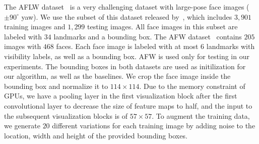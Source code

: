 \begin{table}[t!]\small
\caption{\small Number and size of convolutional filters in each visualization block. For all blocks, the two fully connected layers have the same length of $800$ and $236$.}\figvspace\vspace{-3mm}
\begin{center}
\end{center}
\label{table:VBdetail}\vspace{-10mm}
\end{table}
\vspace{-1mm}
\vspace{-2mm}
The AFLW dataset~\cite{kostinger2011annotated} is a very challenging dataset with large-pose face images ($\pm90^{\circ}$ yaw). 
We use the subset of this dataset released by~\cite{jourabloo2016large}, which includes $3,901$ training images  and $1,299$ testing images. 
All face images in this subset are labeled with $34$ landmarks and a bounding box.
The AFW dataset~\cite{zhu2012face} contains $205$ images with $468$ faces. 
Each face image is labeled with at most $6$ landmarks with visibility labels, as well as a bounding box. 
AFW is used only for testing in our experiments. 
The bounding boxes in both datasets are used as initilization for our algorithm, as well as the baselines. 
We crop the face image inside the bounding box and normalize it to $114 \times 114$. 
Due to the memory constraint of GPUs, we have a pooling layer in the first visualization block after the first convolutional layer to decrease the size of feature maps to half, and the input to the subsequent visualization blocks is of $57 \times 57$.
To augment the training data, we generate $20$ different variations for each training image by adding noise to the location, width and height of the provided bounding boxes.


